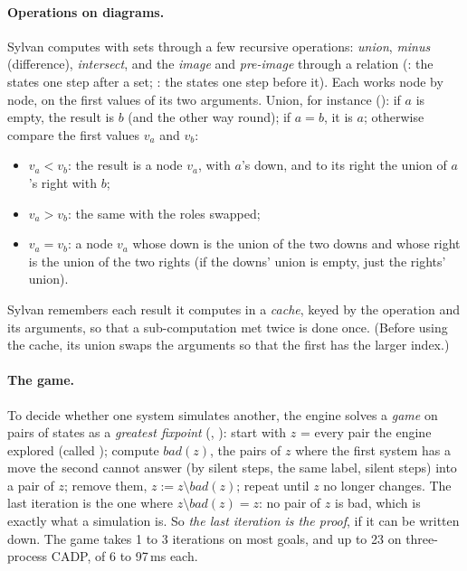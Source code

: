 \paragraph{Operations on diagrams.} Sylvan computes with sets through a
few recursive operations: \emph{union}, \emph{minus} (difference),
\emph{intersect}, and the \emph{image} and \emph{pre-image} through a
relation (: the states one step after a set;
: the states one step before it). Each works node by
node, on the first values of its two arguments. Union, for instance
(): if $a$ is empty, the result is
$b$ (and the other way round); if $a = b$, it is $a$; otherwise compare the
first values $v_a$ and $v_b$:
\begin{itemize}
\item $v_a < v_b$: the result is a node $v_a$, with $a$'s down, and to its
  right the union of $a$'s right with $b$;
\item $v_a > v_b$: the same with the roles swapped;
\item $v_a = v_b$: a node $v_a$ whose down is the union of the two downs
  and whose right is the union of the two rights (if the downs' union is
  empty, just the rights' union).
\end{itemize}
Sylvan remembers each result it computes in a \emph{cache}, keyed by the
operation and its arguments, so that a sub-computation met twice is done
once. (Before using the cache, its union swaps the arguments so that the
first has the larger index.)

\paragraph{The game.} To decide whether one system simulates another, the
engine solves a \emph{game} on pairs of states as a \emph{greatest
fixpoint} (, ): start with $z$ = every
pair the engine explored (called ); compute $\mathit{bad}(z)$,
the pairs of $z$ where the first system has a move the second cannot
answer (by silent steps, the same label, silent steps) into a pair of $z$;
remove them, $z := z \setminus \mathit{bad}(z)$; repeat until $z$ no longer
changes. The last iteration is the one where $z \setminus \mathit{bad}(z) =
z$: no pair of $z$ is bad, which is exactly what a simulation is. So
\emph{the last iteration is the proof}, if it can be written down. The
game takes 1 to 3 iterations on most goals, and up to 23 on
three-process CADP, of 6 to 97\,ms each.

